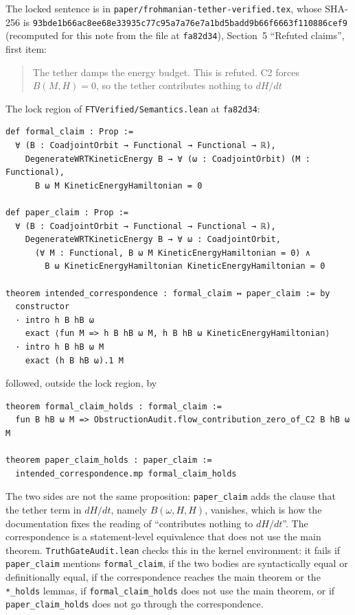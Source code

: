 \documentclass[11pt,a4paper]{article}
\newcommand{\code}[1]{\texttt{#1}}
\begin{document}
The locked sentence is in \code{paper/frohmanian-tether-verified.tex}, whose SHA-256 is
\code{93bde1b66ac8ee68e33935c77c95a7a76e7a1bd5badd9b66f6663f110886cef9} (recomputed for this
note from the file at \code{fa82d34}), Section~5 ``Refuted claims'', first item:
\begin{quote}\small
The tether damps the energy budget. This is refuted. C2 forces $B(M,H)=0$, so the tether
contributes nothing to $dH/dt$
\end{quote}
The lock region of \code{FTVerified/Semantics.lean} at \code{fa82d34}:
\begin{Verbatim}
def formal_claim : Prop :=
  ∀ (B : CoadjointOrbit → Functional → Functional → ℝ),
    DegenerateWRTKineticEnergy B → ∀ (ω : CoadjointOrbit) (M : Functional),
      B ω M KineticEnergyHamiltonian = 0

def paper_claim : Prop :=
  ∀ (B : CoadjointOrbit → Functional → Functional → ℝ),
    DegenerateWRTKineticEnergy B → ∀ ω : CoadjointOrbit,
      (∀ M : Functional, B ω M KineticEnergyHamiltonian = 0) ∧
        B ω KineticEnergyHamiltonian KineticEnergyHamiltonian = 0

theorem intended_correspondence : formal_claim ↔ paper_claim := by
  constructor
  · intro h B hB ω
    exact ⟨fun M => h B hB ω M, h B hB ω KineticEnergyHamiltonian⟩
  · intro h B hB ω M
    exact (h B hB ω).1 M
\end{Verbatim}
followed, outside the lock region, by
\begin{Verbatim}
theorem formal_claim_holds : formal_claim :=
  fun B hB ω M => ObstructionAudit.flow_contribution_zero_of_C2 B hB ω M

theorem paper_claim_holds : paper_claim :=
  intended_correspondence.mp formal_claim_holds
\end{Verbatim}
The two sides are not the same proposition: \code{paper\_claim} adds the clause that the tether
term in $dH/dt$, namely $B(\omega,H,H)$, vanishes, which is how the documentation fixes the
reading of ``contributes nothing to $dH/dt$''. The correspondence is a statement-level
equivalence that does not use the main theorem. \code{TruthGateAudit.lean} checks this in the
kernel environment: it fails if \code{paper\_claim} mentions \code{formal\_claim}, if the two
bodies are syntactically equal or definitionally equal, if the correspondence reaches the main
theorem or the \code{*\_holds} lemmas, if \code{formal\_claim\_holds} does not use the main
theorem, or if \code{paper\_claim\_holds} does not go through the correspondence.
\end{document}
